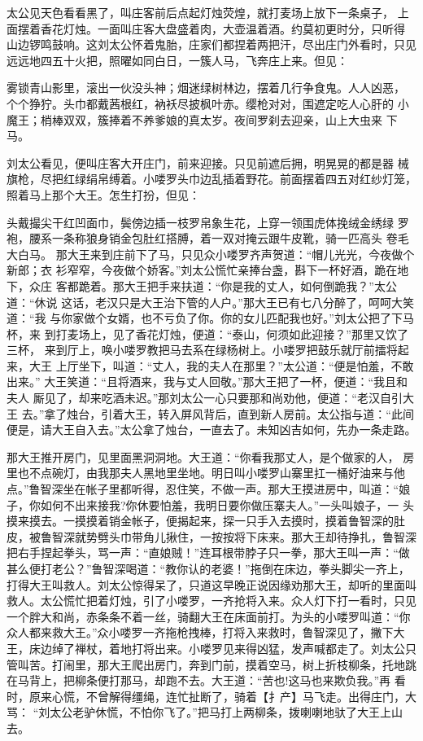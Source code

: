 太公见天色看看黑了，叫庄客前后点起灯烛荧煌，就打麦场上放下一条桌子，
上面摆着香花灯烛。一面叫庄客大盘盛着肉，大壶温着酒。约莫初更时分，只听得
山边锣鸣鼓响。这刘太公怀着鬼胎，庄家们都捏着两把汗，尽出庄门外看时，只见
远远地四五十火把，照曜如同白日，一簇人马，飞奔庄上来。但见：

雾锁青山影里，滚出一伙没头神；烟迷绿树林边，摆着几行争食鬼。人人凶恶，
个个狰狞。头巾都戴茜根红，衲袄尽披枫叶赤。缨枪对对，围遮定吃人心肝的
小魔王；梢棒双双，簇捧着不养爹娘的真太岁。夜间罗刹去迎亲，山上大虫来
下马。

刘太公看见，便叫庄客大开庄门，前来迎接。只见前遮后拥，明晃晃的都是器
械旗枪，尽把红绿绢帛缚着。小喽罗头巾边乱插着野花。前面摆着四五对红纱灯笼，
照着马上那个大王。怎生打扮，但见：

头戴撮尖干红凹面巾，鬓傍边插一枝罗帛象生花，上穿一领围虎体挽绒金绣绿
罗袍，腰系一条称狼身销金包肚红搭膊，着一双对掩云跟牛皮靴，骑一匹高头
卷毛大白马。
那大王来到庄前下了马，只见众小喽罗齐声贺道：“帽儿光光，今夜做个新郎；衣
衫窄窄，今夜做个娇客。”刘太公慌忙亲捧台盏，斟下一杯好酒，跪在地下，众庄
客都跪着。那大王把手来扶道：“你是我的丈人，如何倒跪我？”太公道：“休说
这话，老汉只是大王治下管的人户。”那大王已有七八分醉了，呵呵大笑道：“我
与你家做个女婿，也不亏负了你。你的女儿匹配我也好。”刘太公把了下马杯，来
到打麦场上，见了香花灯烛，便道：“泰山，何须如此迎接？”那里又饮了三杯，
来到厅上，唤小喽罗教把马去系在绿杨树上。小喽罗把鼓乐就厅前擂将起来，大王
上厅坐下，叫道：“丈人，我的夫人在那里？”太公道：“便是怕羞，不敢出来。”
大王笑道：“且将酒来，我与丈人回敬。”那大王把了一杯，便道：“我且和夫人
厮见了，却来吃酒未迟。”那刘太公一心只要那和尚劝他，便道：“老汉自引大王
去。”拿了烛台，引着大王，转入屏风背后，直到新人房前。太公指与道：“此间
便是，请大王自入去。”太公拿了烛台，一直去了。未知凶吉如何，先办一条走路。

那大王推开房门，见里面黑洞洞地。大王道：“你看我那丈人，是个做家的人，
房里也不点碗灯，由我那夫人黑地里坐地。明日叫小喽罗山寨里扛一桶好油来与他
点。”鲁智深坐在帐子里都听得，忍住笑，不做一声。那大王摸进房中，叫道：“娘
子，你如何不出来接我?你休要怕羞，我明日要你做压寨夫人。”一头叫娘子，一
头摸来摸去。一摸摸着销金帐子，便揭起来，探一只手入去摸时，摸着鲁智深的肚
皮，被鲁智深就势劈头巾带角儿揪住，一按按将下床来。那大王却待挣扎，鲁智深
把右手捏起拳头，骂一声：“直娘贼！”连耳根带脖子只一拳，那大王叫一声：“做
甚么便打老公？”鲁智深喝道：“教你认的老婆！”拖倒在床边，拳头脚尖一齐上，
打得大王叫救人。刘太公惊得呆了，只道这早晚正说因缘劝那大王，却听的里面叫
救人。太公慌忙把着灯烛，引了小喽罗，一齐抢将入来。众人灯下打一看时，只见
一个胖大和尚，赤条条不着一丝，骑翻大王在床面前打。为头的小喽罗叫道：“你
众人都来救大王。”众小喽罗一齐拖枪拽棒，打将入来救时，鲁智深见了，撇下大
王，床边绰了禅杖，着地打将出来。小喽罗见来得凶猛，发声喊都走了。刘太公只
管叫苦。打闹里，那大王爬出房门，奔到门前，摸着空马，树上折枝柳条，托地跳
在马背上，把柳条便打那马，却跑不去。大王道：“苦也!这马也来欺负我。”再
看时，原来心慌，不曾解得缰绳，连忙扯断了，骑着【扌产】马飞走。出得庄门，大骂：
“刘太公老驴休慌，不怕你飞了。”把马打上两柳条，拨喇喇地驮了大王上山去。

